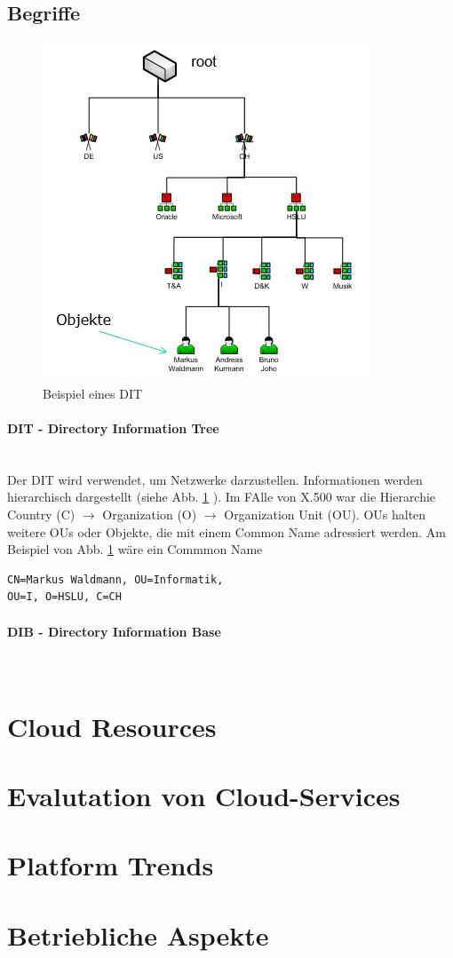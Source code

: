 \documentclass[a4paper, 11pt]{article}
\begin{document}
\subsection{Begriffe}
\begin{figure}
	\centering
	\includegraphics[keepaspectratio=true,height=10\baselineskip]{DIT.PNG}
	\caption{Beispiel eines DIT}
	\label{fig:dti}
\end{figure}
\paragraph{DIT - Directory Information Tree}\mbox{}\\
Der DIT wird verwendet, um Netzwerke darzustellen. Informationen werden hierarchisch dargestellt (siehe Abb. \ref{fig:dti} ). Im FAlle von X.500 war die Hierarchie Country (C) $\rightarrow$ Organization (O) $\rightarrow$ Organization Unit (OU). OUs halten weitere OUs oder Objekte, die mit einem Common Name adressiert werden. Am Beispiel von Abb. \ref{fig:dti} wäre ein Commmon Name 

\begin{lstlisting}
CN=Markus Waldmann, OU=Informatik, 
OU=I, O=HSLU, C=CH
\end{lstlisting}

\paragraph{DIB - Directory Information Base} \mbox{} \\


\section{Cloud Resources}

\section{Evalutation von Cloud-Services}

\section{Platform Trends}

\section{Betriebliche Aspekte}
\end{document}
